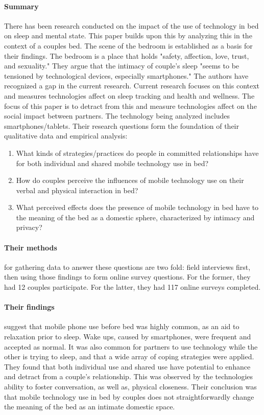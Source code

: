 \paragraph{Summary}
There has been research conducted on the impact of the use of technology in bed on sleep and mental state. This paper builds upon this by analyzing this in the context of a couples bed. The scene of the bedroom is established as a basis for their findings. The bedroom is a place that holds "safety, affection, love, trust, and sexuality." They argue that the intimacy of couple's sleep "seems to be tensioned by technological devices, especially smartphones." The authors have recognized a gap in the current research. Current research focuses on this context and measures technologies affect on sleep tracking and health and wellness. The focus of this paper is to detract from this and measure technologies affect on the social impact between partners. The technology being analyzed includes smartphones/tablets. Their research questions form the foundation of their qualitative data and empirical analysis:

\begin{enumerate}
\item
  What kinds of strategies/practices do people in committed relationships have for both individual and shared mobile technology use in bed?
\item
  How do couples perceive the influences of mobile technology use on their verbal and physical interaction in bed?
\item
  What perceived effects does the presence of mobile technology in bed have to the meaning of the bed as a domestic sphere, characterized by intimacy and privacy?
\end{enumerate}

\paragraph{Their methods} for gathering data to answer these questions are two fold: field interviews first, then using those findings to form online survey questions. For the former, they had 12 couples participate. For the latter, they had 117 online surveys completed.

\paragraph{Their findings} suggest that mobile phone use before bed was highly common, as an aid to relaxation prior to sleep. Wake ups, caused by smartphones, were frequent and accepted as normal. It was also common for partners to use technology while the other is trying to sleep, and that a wide array of coping strategies were applied. They found that both individual use and shared use have potential to enhance and detract from a couple's relationship. This was observed by the technologies ability to foster conversation, as well as, physical closeness. Their conclusion was that mobile technology use in bed by couples does not straightforwardly change the meaning of the bed as an intimate domestic space.

